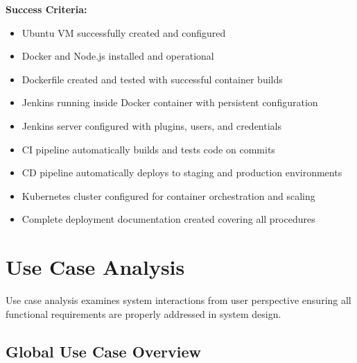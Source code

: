 \textbf{Success Criteria:}
\begin{itemize}
\item Ubuntu VM successfully created and configured
\item Docker and Node.js installed and operational
\item Dockerfile created and tested with successful container builds
\item Jenkins running inside Docker container with persistent configuration
\item Jenkins server configured with plugins, users, and credentials
\item CI pipeline automatically builds and tests code on commits
\item CD pipeline automatically deploys to staging and production environments
\item Kubernetes cluster configured for container orchestration and scaling
\item Complete deployment documentation created covering all procedures
\end{itemize}

\section{Use Case Analysis}

Use case analysis examines system interactions from user perspective ensuring all functional requirements are properly addressed in system design.

\subsection{Global Use Case Overview}

